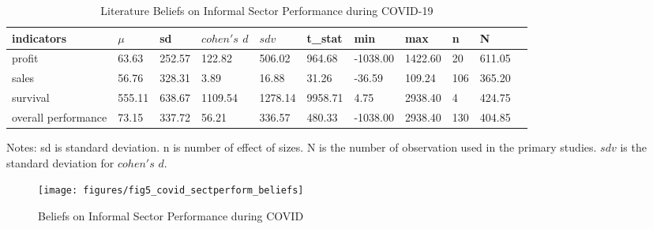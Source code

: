 \documentclass[a4paper, 12pt]{article}
\begin{document}
    \begin{table}[H]
        \centering
        \caption{Literature Beliefs on Informal Sector Performance during COVID-19}
        \label{tab4:literature-beliefs-informal-covid}
        \begin{tabular}{lllllllllll}
            \toprule
            indicators          & $\mu$  & sd     & $cohen's$ $d$ & $sdv$   & t\_stat & min      & max     & n   & N      \\
            \midrule
            profit              & 63.63  & 252.57 & 122.82        & 506.02  & 964.68  & -1038.00 & 1422.60 & 20  & 611.05 \\
            sales               & 56.76  & 328.31 & 3.89          & 16.88   & 31.26   & -36.59   & 109.24  & 106 & 365.20 \\
            survival            & 555.11 & 638.67 & 1109.54       & 1278.14 & 9958.71 & 4.75     & 2938.40 & 4   & 424.75 \\
            overall performance & 73.15  & 337.72 & 56.21         & 336.57  & 480.33  & -1038.00 & 2938.40 & 130 & 404.85 \\
            \bottomrule
        \end{tabular}
        \begin{minipage}{17cm}
            \vspace{0.1cm}
            \small Notes: sd is standard deviation. n is number of effect of sizes. N is the number of observation used in the primary studies. $sdv$ is the standard deviation for $cohen's$ $d$.
        \end{minipage}
    \end{table}

    \begin{figure}[H]
        \centering
        \texttt{[image: figures/fig5\_covid\_sectperform\_beliefs]}
        \caption{Beliefs on Informal Sector Performance during COVID}
        \label{fig4:beliefs-inf-sector-perform-covid}
    \end{figure}
\end{document}
